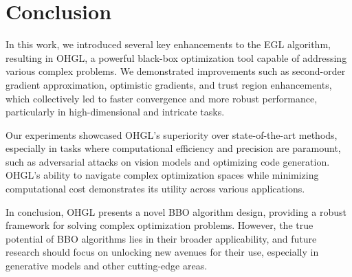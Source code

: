 \section{Conclusion} \label{conclusion}
In this work, we introduced several key enhancements to the EGL algorithm, resulting in OHGL, a powerful black-box optimization tool capable of addressing various complex problems. We demonstrated improvements such as second-order gradient approximation, optimistic gradients, and trust region enhancements, which collectively led to faster convergence and more robust performance, particularly in high-dimensional and intricate tasks.

Our experiments showcased OHGL's superiority over state-of-the-art methods, especially in tasks where computational efficiency and precision are paramount, such as adversarial attacks on vision models and optimizing code generation. OHGL’s ability to navigate complex optimization spaces while minimizing computational cost demonstrates its utility across various applications.


In conclusion, OHGL presents a novel BBO algorithm design, providing a robust framework for solving complex optimization problems. However, the true potential of BBO algorithms lies in their broader applicability, and future research should focus on unlocking new avenues for their use, especially in generative models and other cutting-edge areas.
